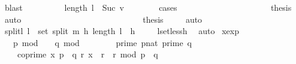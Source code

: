 \begin{isabellebody}
\ blast\isanewline
\ \ \ \ \ \ \isamarkupfalse%
\ \isamarkupfalse%
\ {\isachardoublequoteopen}length\ l\ {\isasymle}\ Suc\ v{\isachardoublequoteclose}\isanewline
\ \ \ \ \ \ \isamarkupfalse%
\ cases\isanewline
\ \ \ \ \ \ \ \ \isamarkupfalse%
\ {}\isanewline
\ \ \ \ \ \ \ \ \isamarkupfalse%
\ \isamarkupfalse%
\ {\isacharquery}{\kern0pt}thesis\ \isamarkupfalse%
\ auto\isanewline
\ \ \ \ \ \ \isamarkupfalse%
\isanewline
\ \ \ \ \ \ \ \ \isamarkupfalse%
\ {}\isanewline
\ \ \ \ \ \ \ \ \isamarkupfalse%
\ \isamarkupfalse%
\ {\isacharquery}{\kern0pt}thesis\ \isamarkupfalse%
\ {}{\isacharparenleft}{\kern0pt}{}{\isacharparenright}{\kern0pt}\ \isamarkupfalse%
\ auto\isanewline
\ \ \ \ \ \ \isamarkupfalse%
\isanewline
\ \ \ \ \isamarkupfalse%
%
\endisatagproof
{\isafoldproof}%
%
\isadelimproof
\isanewline
%
\endisadelimproof
\ \ \ \isanewline
\isanewline
{}\isamarkupfalse%
\ split{\isacharunderscore}{\kern0pt}l{\isacharcolon}{\kern0pt}\ {\isachardoublequoteopen}{\isasymforall}l\ {\isasymin}\ set\ {\isacharparenleft}{\kern0pt}split\ m\ h{\isacharparenright}{\kern0pt}{\isachardot}{\kern0pt}\ length\ l\ {\isasymle}\ h{\isachardoublequoteclose}\ \isanewline
%
\isadelimproof
\ \ %
\endisadelimproof
%
\isatagproof
{}\isamarkupfalse%
\ l{\isacharunderscore}{\kern0pt}set{\isacharunderscore}{\kern0pt}less{\isacharunderscore}{\kern0pt}h\ \isamarkupfalse%
\ auto%
\endisatagproof
{\isafoldproof}%
%
\isadelimproof
\isanewline
%
\endisadelimproof
\isanewline
{}\isamarkupfalse%
\ x{\isacharunderscore}{\kern0pt}exp{\isacharcolon}{\kern0pt}\ \isanewline
\ \ \ {\isachardoublequoteopen}p\ mod\ {}\ {\isacharequal}{\kern0pt}\ {}{\isachardoublequoteclose}\ {\isachardoublequoteopen}q\ mod\ {}\ {\isacharequal}{\kern0pt}\ {}{\isachardoublequoteclose}\ \isanewline
\ \ \ \ {\isachardoublequoteopen}prime\ {\isacharparenleft}{\kern0pt}p{\isacharcolon}{\kern0pt}{\isacharcolon}{\kern0pt}nat{\isacharparenright}{\kern0pt}{\isachardoublequoteclose}\ {\isachardoublequoteopen}prime\ q{\isachardoublequoteclose}\ \isanewline
\ \ \ \ {\isachardoublequoteopen}coprime\ x\ {\isacharparenleft}{\kern0pt}p\ {\isacharasterisk}{\kern0pt}\ q{\isacharparenright}{\kern0pt}{\isachardoublequoteclose}\ {\isachardoublequoteopen}{\isasymexists}r{\isachardot}{\kern0pt}\ {\isacharbrackleft}{\kern0pt}x\ {\isacharequal}{\kern0pt}\ r\ {\isacharasterisk}{\kern0pt}\ r{\isacharbrackright}{\kern0pt}\ {\isacharparenleft}{\kern0pt}mod\ p\ {\isacharasterisk}{\kern0pt}\ q{\isacharparenright}{\kern0pt}{\isachardoublequoteclose}\isanewline

\end{isabellebody}
